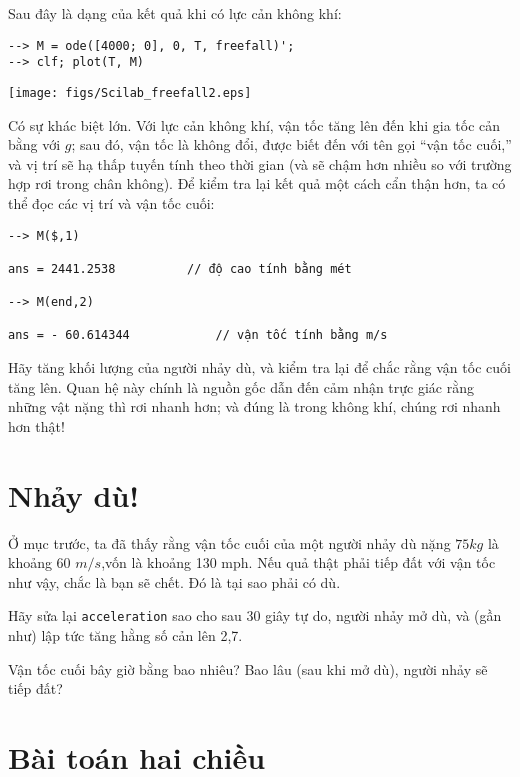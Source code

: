 \documentclass[12pt]{book}
\begin{document}
Sau đây là dạng của kết quả khi có lực cản không khí:

\begin{verbatim}
--> M = ode([4000; 0], 0, T, freefall)';
--> clf; plot(T, M)
\end{verbatim}
%
\centerline{\texttt{[image: figs/Scilab\_freefall2.eps]}}

Có sự khác biệt lớn. Với lực cản không khí, vận tốc tăng lên
đến khi gia tốc cản bằng với $g$; sau đó, vận tốc là không đổi,
được biết đến với tên gọi ``vận tốc cuối,'' và vị trí sẽ hạ thấp
tuyến tính theo thời gian (và sẽ chậm hơn nhiều so với trường hợp
rơi trong chân không). Để kiểm tra lại kết quả một cách cẩn thận
hơn, ta có thể đọc các vị trí và vận tốc cuối:

\begin{verbatim}
--> M($,1)

ans = 2441.2538          // độ cao tính bằng mét

--> M(end,2)

ans = - 60.614344            // vận tốc tính bằng m/s
\end{verbatim}
%
\begin{ex}
Hãy tăng khối lượng của người nhảy dù, và kiểm tra lại để chắc
rằng vận tốc cuối tăng lên. Quan hệ này chính là nguồn gốc dẫn đến
cảm nhận trực giác rằng những vật nặng thì rơi nhanh hơn; và
đúng là trong không khí, chúng rơi nhanh hơn thật!
\end{ex}


\section{Nhảy dù!}

Ở mục trước, ta đã thấy rằng vận tốc cuối của một người nhảy dù
nặng $75 kg$ là khoảng 60 $m/s$,vốn là khoảng 130 mph. Nếu 
quả thật phải tiếp đất với vận tốc như vậy, chắc là bạn sẽ chết. 
Đó là tại sao phải có dù.

\begin{ex}
Hãy sửa lại {\tt acceleration} sao cho sau 30 giây tự do, người nhảy
mở dù, và (gần như) lập tức tăng hằng số cản lên 2,7.

Vận tốc cuối bây giờ bằng bao nhiêu? Bao lâu (sau khi mở dù), người
nhảy sẽ tiếp đất?
\end{ex}


\section{Bài toán hai chiều}
\label{projectile}
\end{document}
